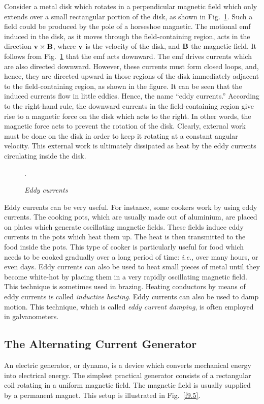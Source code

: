 Consider a  metal disk which rotates in a perpendicular magnetic field which only
extends over a small rectangular portion of the disk, as shown in Fig.~\ref{f9.4}. Such a field could be produced by the pole of a horseshoe magnetic. 
The motional emf induced in the disk, as it moves through the field-containing
region, acts in the direction ${\bf v}\times{\bf B}$, where ${\bf v}$ is
the velocity of the disk, and ${\bf B}$ the magnetic field. It follows
from Fig.~\ref{f9.4} that the emf acts downward. The emf drives  currents which are
also directed downward. However, these currents must form closed loops, and,
hence, they are directed upward in those regions of the disk immediately adjacent
to the field-containing region, as shown in the figure. It can be seen that
the induced currents flow in little eddies. Hence, the name ``eddy currents.''
According to the right-hand rule, the downward currents in the field-containing
region give rise to a magnetic force on the disk which acts to the right. 
In other words, the magnetic force acts to prevent the rotation of the disk. 
Clearly, external  work must be done on the disk in order to keep it 
rotating at a constant angular velocity. This external work is ultimately
dissipated as heat 
 by the eddy currents circulating inside  the disk. 

\begin{figure}
\epsfysize=3in
\centerline{}
\caption{\em Eddy currents}.\label{f9.4}
\end{figure}

Eddy currents can be  very useful. For instance, some cookers work by  using
eddy currents. The cooking pots, which are usually made out of aluminium, are placed
on plates which generate oscillating magnetic fields. These fields induce
eddy currents in the pots which heat them up. The heat is then transmitted
to the food inside the pots. This type of cooker is particularly useful for
food which needs to be  cooked gradually over a long period of time: {\em i.e.},
over many hours, or even days. Eddy currents can also be used to heat small 
pieces of metal until they become  white-hot by  placing them  in a very
rapidly oscillating magnetic field. This technique is sometimes used in brazing. 
Heating conductors by means of eddy currents is called {\em inductive heating}.
Eddy currents can also be used to damp motion. This technique, which
is called {\em eddy current damping},  is often
employed in galvanometers.

\subsection{The Alternating Current Generator}\label{s9.6}
An electric generator, or dynamo,  is a device which converts mechanical energy into
electrical energy. The simplest practical generator consists of a rectangular
coil rotating in a uniform magnetic field. The magnetic field is usually supplied
by a permanent magnet. This setup is illustrated in Fig.~\ref{f9.5}.

